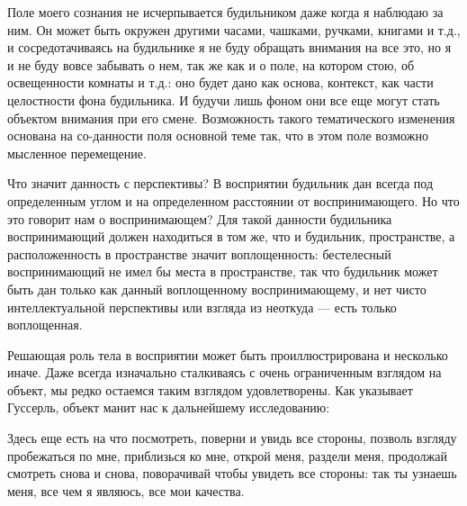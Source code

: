 \documentclass[11pt]{book}
\begin{document}
Поле моего сознания не исчерпывается будильником даже когда я наблюдаю за ним. Он может быть окружен другими часами, чашками, ручками, книгами и т.д., и сосредотачиваясь на будильнике я не буду обращать внимания на все это, но я и не буду вовсе забывать о нем, так же как и о поле, на котором стою, об освещенности комнаты и т.д.: оно будет дано как основа, контекст, как части целостности фона будильника. И будучи лишь фоном они все еще могут стать объектом внимания при его смене. Возможность такого тематического изменения основана на со-данности поля основной теме так, что в этом поле возможно мысленное перемещение.

Что значит данность с перспективы? В восприятии будильник дан всегда под определенным углом и на определенном расстоянии от воспринимающего. Но что это говорит нам о воспринимающем? Для такой данности будильника воспринимающий должен находиться в том же, что и будильник, пространстве, а расположенность в пространстве значит воплощенность: бестелесный воспринимающий не имел бы места в пространстве, так что будильник может быть дан только как данный воплощенному воспринимающему, и нет чисто интеллектуальной перспективы или взгляда из неоткуда --- есть только воплощенная.

Решающая роль тела в восприятии может быть проиллюстрирована и несколько иначе. Даже всегда изначально сталкиваясь с очень ограниченным взглядом на объект, мы редко остаемся таким взглядом удовлетворены. Как указывает Гуссерль, объект манит нас к дальнейшему исследованию:

\smallskip
{}\relax
{}\relax

Здесь еще есть на что посмотреть, поверни и увидь все стороны, позволь взгляду пробежаться по мне, приблизься ко мне, открой меня, раздели меня, продолжай смотреть снова и снова, поворачивай чтобы увидеть все стороны: так ты узнаешь меня, все чем я являюсь, все мои качества.

\relax
{}\relax
\smallskip
\end{document}
